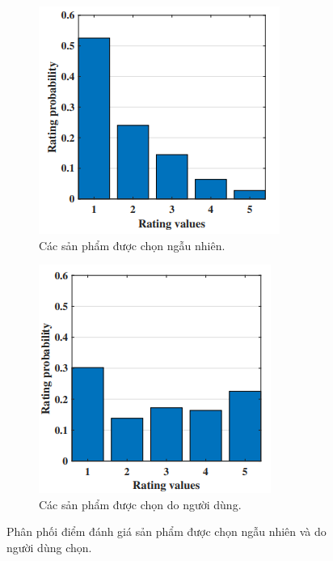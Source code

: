 \begin{figure}
    \centering
    \begin{subfigure}[b]{0.4\textwidth}
     \centering
     \includegraphics[width=\textwidth]{Chapter1/bias_1.png}
     \caption{Các sản phẩm được chọn ngẫu nhiên.}
     \label{fig:randomly_selected}
    \end{subfigure}
    \hfill
    \begin{subfigure}[b]{0.4\textwidth}
     \centering
     \includegraphics[width=\textwidth]{Chapter1/bias_2.png}
     \caption{Các sản phẩm được chọn do người dùng.}
     \label{fig:user_selected}
    \end{subfigure}
    \caption{Phân phối điểm đánh giá sản phẩm được chọn ngẫu nhiên và do người dùng chọn.}
    \label{fig:self_selection_bias}
\end{figure}


